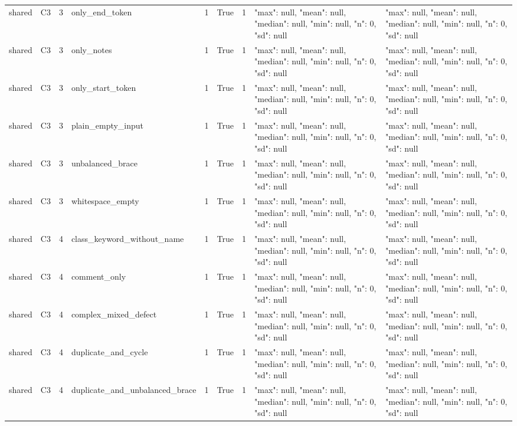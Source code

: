 \begin{tabular}{lllllllll}
shared & C3 & 3 & only\_end\_token & 1 & True & 1 & {"max": null, "mean": null, "median": null, "min": null, "n": 0, "sd": null} & {"max": null, "mean": null, "median": null, "min": null, "n": 0, "sd": null} \\
shared & C3 & 3 & only\_notes & 1 & True & 1 & {"max": null, "mean": null, "median": null, "min": null, "n": 0, "sd": null} & {"max": null, "mean": null, "median": null, "min": null, "n": 0, "sd": null} \\
shared & C3 & 3 & only\_start\_token & 1 & True & 1 & {"max": null, "mean": null, "median": null, "min": null, "n": 0, "sd": null} & {"max": null, "mean": null, "median": null, "min": null, "n": 0, "sd": null} \\
shared & C3 & 3 & plain\_empty\_input & 1 & True & 1 & {"max": null, "mean": null, "median": null, "min": null, "n": 0, "sd": null} & {"max": null, "mean": null, "median": null, "min": null, "n": 0, "sd": null} \\
shared & C3 & 3 & unbalanced\_brace & 1 & True & 1 & {"max": null, "mean": null, "median": null, "min": null, "n": 0, "sd": null} & {"max": null, "mean": null, "median": null, "min": null, "n": 0, "sd": null} \\
shared & C3 & 3 & whitespace\_empty & 1 & True & 1 & {"max": null, "mean": null, "median": null, "min": null, "n": 0, "sd": null} & {"max": null, "mean": null, "median": null, "min": null, "n": 0, "sd": null} \\
shared & C3 & 4 & class\_keyword\_without\_name & 1 & True & 1 & {"max": null, "mean": null, "median": null, "min": null, "n": 0, "sd": null} & {"max": null, "mean": null, "median": null, "min": null, "n": 0, "sd": null} \\
shared & C3 & 4 & comment\_only & 1 & True & 1 & {"max": null, "mean": null, "median": null, "min": null, "n": 0, "sd": null} & {"max": null, "mean": null, "median": null, "min": null, "n": 0, "sd": null} \\
shared & C3 & 4 & complex\_mixed\_defect & 1 & True & 1 & {"max": null, "mean": null, "median": null, "min": null, "n": 0, "sd": null} & {"max": null, "mean": null, "median": null, "min": null, "n": 0, "sd": null} \\
shared & C3 & 4 & duplicate\_and\_cycle & 1 & True & 1 & {"max": null, "mean": null, "median": null, "min": null, "n": 0, "sd": null} & {"max": null, "mean": null, "median": null, "min": null, "n": 0, "sd": null} \\
shared & C3 & 4 & duplicate\_and\_unbalanced\_brace & 1 & True & 1 & {"max": null, "mean": null, "median": null, "min": null, "n": 0, "sd": null} & {"max": null, "mean": null, "median": null, "min": null, "n": 0, "sd": null} \\

\end{tabular}
